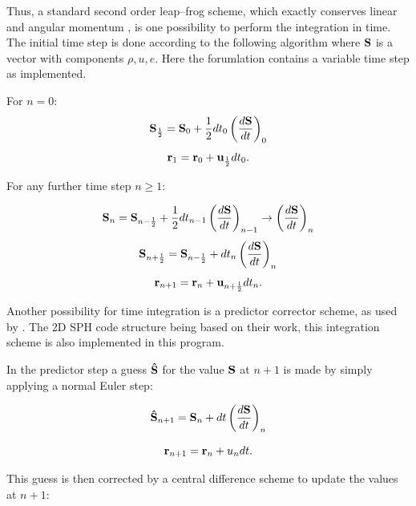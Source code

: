 \documentclass[11pt,a4paper,twoside]{report}
\begin{document}
Thus, a standard second order leap--frog scheme, %
 which exactly conserves linear and angular momentum
, is one possibility to perform the integration in
time. The initial time step is done according to the following algorithm where
${\bf S}$ is a vector with components  $\rho,u,e$.
Here the forumlation contains a variable time step as implemented.

For $n=0$:
\begin{equation}
{\bf S}_{\frac{1}{2}}={\bf S}_0+\frac{1}{2}dt_0\left(\frac{d{\bf S}}{dt}\right)_0
\end{equation}
\begin{equation}
{\bf r}_1={\bf r}_0+{\bf u}_{\frac{1}{2}}dt_0 .
\end{equation}

For any further time step $n\ge1$:

\begin{equation}
{\bf S}_n={\bf S}_{n-\frac{1}{2}}+\frac{1}{2}dt_{n-1}\left(\frac{d{\bf S}}{dt}\right)_{n-1} \rightarrow
\left(\frac{d{\bf S}}{dt}\right)_n 
\end{equation}
\begin{equation}
{\bf S}_{n+\frac{1}{2}}={\bf S}_{n-\frac{1}{2}}+dt_n\left(\frac{d{\bf S}}{dt}\right)_n 
\end{equation}
\begin{equation}
{\bf r}_{n+1}={\bf r}_n+{\bf u}_{n+\frac{1}{2}}dt_n .
\end{equation}

Another possibility for time integration is a predictor corrector scheme, as
used by \cite{Hu2007}.
The 2D SPH code structure being based on their work,
this integration scheme is also implemented in this program.

In the predictor step a guess ${\bf \hat S}$ for the value ${\bf S}$ at $n+1$ is made by simply
applying a normal Euler step:

\begin{equation}
{\bf \hat S}_{n+1}={\bf S}_n+dt\left(\frac{d{\bf S}}{dt}\right)_n
\end{equation}

\begin{equation}
{\bf r}_{n+1}={\bf r}_n+ {\bf} u_{n}dt.
\end{equation}

This guess is then corrected by a central difference scheme to update the values at
$n+1$:
\end{document}
